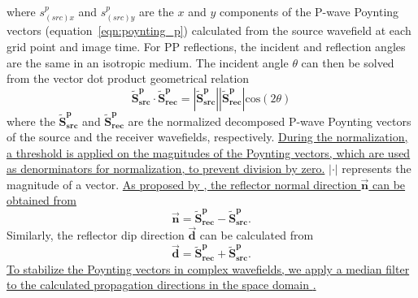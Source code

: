 \documentclass[manuscript,ulem,graphix,revised]{geophysics}
\begin{document}
where $s^{p}_{(src)x}$ and $s^{p}_{(src)y}$ are the $x$ and $y$ components of the P-wave Poynting vectors (equation~\ref{eqn:poynting_p}) calculated from the source wavefield at each grid point and image time. For PP reflections, the incident and reflection angles are the same in an isotropic medium. The incident angle $\theta$ can then be solved from the vector dot product geometrical relation \citep{du17,shabelansky17,zhu17}
\begin{equation}
\mathbf{\tilde{S}^{p}_{src}}\cdot \mathbf{\tilde{S}^p_{rec}}=|\mathbf{\tilde{S}^{p}_{src}}||\mathbf{\tilde{S}^p_{rec}}|\mathrm{cos}(2\theta)
\label{eqn:inc_agl}
\end{equation}
where the $\mathbf{\tilde{S}^{p}_{src}}$ and $\mathbf{\tilde{S}^p_{rec}}$ are the normalized decomposed P-wave Poynting vectors of the source and the receiver wavefields, respectively. \marginpar{[7]} \uline{During the normalization, a threshold is applied on the magnitudes of the Poynting vectors, which are used as denorminators for normalization, to prevent division by zero.}  $|\cdot|$ represents the magnitude of a vector. \marginpar{[5]}\uline{As proposed by \mbox{\citet{du14}}, the reflector normal direction $\overrightarrow{\mathbf{n}}$ can be obtained from}
\begin{equation}
\overrightarrow{\mathbf{n}}=\mathbf{\tilde{S}^p_{rec}}-\mathbf{\tilde{S}^{p}_{src}}.
\end{equation}
Similarly, the reflector dip direction $\overrightarrow{\mathbf{d}}$ can be calculated from \marginpar{[14]}
\begin{equation}
\overrightarrow{\mathbf{d}}=\mathbf{\tilde{S}^p_{rec}}+\mathbf{\tilde{S}^{p}_{src}}.
\end{equation}
\marginpar{[8]}\uline{To stabilize the Poynting vectors in complex wavefields, we apply a median filter to the calculated propagation directions in the space domain \mbox{\citep{jin14}}.}
 
\end{document}
